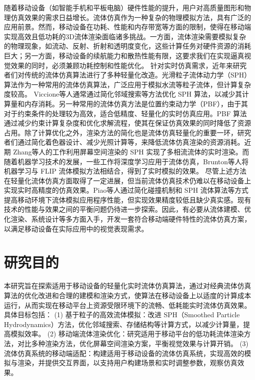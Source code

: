 \indent 随着移动设备（如智能手机和平板电脑）硬件性能的提升，用户对高质量图形和物理仿真效果的需求日益增长。流体仿真作为一种复杂的物理模拟方法，具有广泛的应用前景。然而，移动设备在功耗、性能和内存带宽等方面的限制，使得在移动端实现高效且低功耗的3D流体渲染面临诸多挑战。一方面，流体渲染需要模拟复杂的物理现象，如流动、反射、折射和透明度变化，这些计算任务对硬件资源的消耗巨大；另一方面，移动设备的续航能力和散热性能有限，这要求我们在实现逼真视觉效果的同时，必须兼顾功耗控制和性能优化。
\newline
\indent 针对实时仿真需求，近年来研究者们对传统的流体仿真算法进行了多种轻量化改造。光滑粒子流体动力学（SPH）算法\cite{muller2003particle}作为一种常用的流体仿真算法，广泛应用于模拟水流等粒子流体，但计算复杂度较高。 Viccione\cite{viccione2008defining}等人通常通过简化邻域搜索等方法优化 SPH 算法，以减少其计算量和内存消耗。另一种常用的流体仿真方法是位置约束动力学（PBF）\cite{macklin2013position}，由于其对于约束条件的处理较为高效，适合低精度、轻量化的实时仿真应用。PBF 算法通过减少约束计算复杂度和优化求解流程，使其在保证仿真效果的同时降低了资源占用。除了计算优化之外，渲染方法的简化也是流体仿真轻量化的重要一环，研究者们通过简化着色器设计、减少光照计算\cite{kunimatsu2001fast}等，来降低流体仿真渲染的资源消耗。近期 Zhang\cite{zhang2024real}等人的工作利用屏幕空间渲染的 SPH 实现了多相流流体的实时渲染。而随着机器学习技术的发展，一些工作将深度学习应用于流体仿真\cite{brunton2020machine}，Brunton\cite{pack2018toward}等人将机器学习与 FLIP 流体模拟方法相结合，得到了实时模拟的效果。
\newline
\indent 尽管上述方法在轻量化流体仿真方面取得了一定进展，但当前流体仿真技术仍难以在移动设备上实现实时高精度的仿真效果\cite{wudeyang2020fluid}。Piao\cite{piao2017lightweight}等人通过简化碰撞机制和 SPH 流体算法等方式提高移动环境下流体模拟应用程序性能，但实现效果精度较低且缺少真实感。现有技术的性能与效果之间的平衡问题仍待进一步探索。因此，有必要从流体建模、优化渲染、系统设计等多方面入手，开发一套符合移动端硬件特性的流体仿真方案，以满足移动设备在实际应用中的视觉表现需求。

\section{研究目的}

本研究旨在探索适用于移动设备的轻量化实时流体仿真算法，通过对经典流体仿真算法的优化改进和合理的建模和渲染方式，使算法在移动设备上以适度的计算成本运行，从而实现在移动平台上资源受限环境下的流畅、低耗能实时流体仿真效果。具体目标包括：
\newline
\indent (1) 基于粒子的高效流体模拟：改进 SPH（Smoothed Particle Hydrodynamics）方法，优化邻域搜索、存储结构等计算方式，以减少计算量，提高模拟效率。
\newline
\indent (2) 移动端流体渲染优化：研究适用于移动平台的低功耗流体渲染方法，对比多种渲染方法，优化屏幕空间渲染方案，平衡视觉效果与计算开销。
\newline
\indent (3) 流体仿真系统的移动端适配：构建适用于移动设备的流体仿真系统，实现高效的模拟与渲染，并提供交互界面，以支持用户构建场景和实时调整参数，观察仿真效果。


